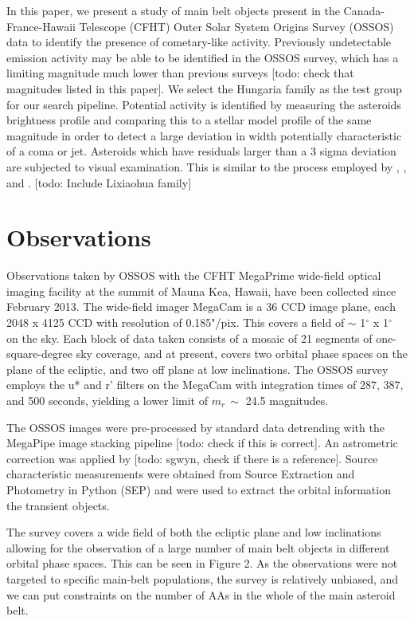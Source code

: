 \documentclass[iop,apj]{emulateapj}
\begin{document}
In this paper, we present a study of main belt objects present in the Canada-France-Hawaii Telescope (CFHT) Outer Solar System Origins Survey (OSSOS) data to identify the presence of cometary-like activity. Previously undetectable emission activity may be able to be identified in the OSSOS survey, which has a limiting magnitude much lower than previous surveys \citep{hsieh15} [todo: check that magnitudes listed in this paper]. We select the Hungaria family as the test group for our search pipeline. Potential activity is identified by measuring the asteroids brightness profile and comparing this to a stellar model profile of the same magnitude in order to detect a large deviation in width potentially characteristic of a coma or jet. Asteroids which have residuals larger than a 3 sigma deviation are subjected to visual examination. This is similar to the process employed by \cite{luu92}, \cite{sonnett11}, and \cite{gilbert09}.
[todo: Include Lixiaohua family]

\section{Observations}

Observations taken by OSSOS with the CFHT MegaPrime wide-field optical imaging facility at the summit of Mauna Kea, Hawaii, have been collected since February 2013. The wide-field imager MegaCam is a 36 CCD image plane, each 2048 x 4125 CCD with resolution of 0.185"/pix. This covers a field of  $\sim$ 1$^{\circ}$ x 1$^{\circ}$ on the sky. Each block of data taken consists of a mosaic of 21 segments of one-square-degree sky coverage, and at present, covers two orbital phase spaces on the plane of the ecliptic, and two off plane at low inclinations. The OSSOS survey employs the u* and r' filters on the MegaCam with integration times of 287, 387, and 500 seconds, yielding a lower limit of $m_r \, \sim$ 24.5 magnitudes.

The OSSOS images were pre-processed by standard data detrending with the MegaPipe image stacking pipeline [todo: check if this is correct]. An astrometric correction was applied by [todo: sgwyn, check if there is a reference]. Source characteristic measurements were obtained from Source Extraction and Photometry in Python (SEP) and were used to extract the orbital information the transient objects. 

The survey covers a wide field of both the ecliptic plane and low inclinations allowing for the observation of a large number of main belt objects in different orbital phase spaces. This can be seen in Figure 2. As the observations were not targeted to specific main-belt populations, the survey is relatively unbiased, and we can put constraints on the number of AAs  in the whole of the main asteroid belt. 
\end{document}
